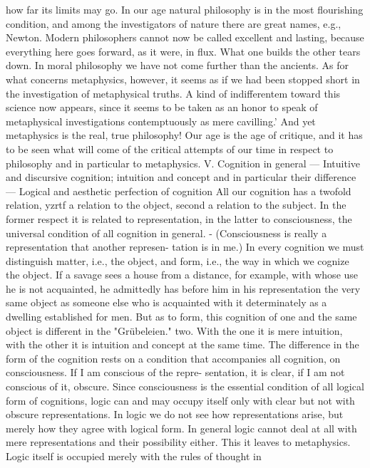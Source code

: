 how far its limits may go.
In our age natural philosophy is in the most flourishing condition, and
among the investigators of nature there are great names, e.g., Newton.
Modern philosophers cannot now be called excellent and lasting, because
everything here goes forward, as it were, in flux. What one builds the
other tears down.
In moral philosophy we have not come further than the ancients. As for
what concerns metaphysics, however, it seems as if we had been stopped
short in the investigation of metaphysical truths. A kind of indifferentem
toward this science now appears, since it seems to be taken as an honor to
speak of metaphysical investigations contemptuously as mere cavilling.'
And yet metaphysics is the real, true philosophy!
Our age is the age of critique, and it has to be seen what will come of the
critical attempts of our time in respect to philosophy and in particular to
metaphysics.
V.
Cognition in general — Intuitive and discursive cognition; intuition
and concept and in particular their difference — Logical and aesthetic
perfection of cognition
All our cognition has a twofold relation, yzrtf a relation to the object, second a
relation to the subject. In the former respect it is related to representation,
in the latter to consciousness, the universal condition of all cognition in
general. - (Consciousness is really a representation that another represen-
tation is in me.)
In every cognition we must distinguish matter, i.e., the object, and form,
i.e., the way in which we cognize the object. If a savage sees a house from a
distance, for example, with whose use he is not acquainted, he admittedly
has before him in his representation the very same object as someone else
who is acquainted with it determinately as a dwelling established for men.
But as to form, this cognition of one and the same object is different in the
"Grübeleien."
two. With the one it is mere intuition, with the other it is intuition and
concept at the same time.
The difference in the form of the cognition rests on a condition that
accompanies all cognition, on consciousness. If I am conscious of the repre-
sentation, it is clear, if I am not conscious of it, obscure.
Since consciousness is the essential condition of all logical form of
cognitions, logic can and may occupy itself only with clear but not with
obscure representations. In logic we do not see how representations arise,
but merely how they agree with logical form. In general logic cannot deal
at all with mere representations and their possibility either. This it leaves
to metaphysics. Logic itself is occupied merely with the rules of thought in
